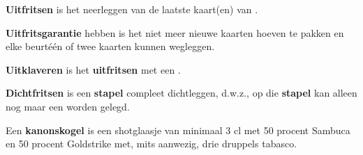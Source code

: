 \item \label{item:uitfritsen} \textbf{Uitfritsen} is het neerleggen van de laatste kaart(en) van \eenSpelerN.

\item  \label{item:uitfritsgarantie} \textbf{Uitfritsgarantie} hebben is het niet meer nieuwe kaarten hoeven te pakken en elke beurt\footnotemark[1] \'e\'en of twee kaarten kunnen wegleggen.

\item \label{item:uitklaver} \textbf{Uitklaveren} is het \textbf{uitfritsen} met een \footnotemark[4].

\item \textbf{Dichtfritsen} is een \textbf{stapel} compleet dichtleggen, d.w.z., op die \textbf{stapel} kan alleen nog maar een  worden gelegd.

\item \label{item:kanonskogel} Een \textbf{kanonskogel} is een shotglaasje van minimaal 3 cl met 50 procent Sambuca en 50 procent Goldstrike met, mits aanwezig, drie druppels tabasco.

\eindABCLijst

